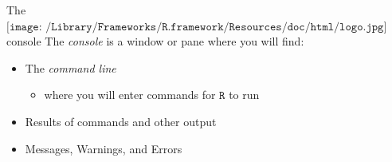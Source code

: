 \documentclass[
  ignorenonframetext,
]{beamer}
\providecommand{\tightlist}{%
  \setlength{\itemsep}{0pt}\setlength{\parskip}{0pt}}
\begin{document}
\begin{frame}{The
\(\texttt{[image: /Library/Frameworks/R.framework/Resources/doc/html/logo.jpg]}\)
console}
\protect\hypertarget{the-includegraphicsheight1emlibraryframeworksr.frameworkresourcesdochtmllogo.jpg-console}{}
The \emph{console} is a window or pane where you will find:

\begin{itemize}
\item
  The \emph{command line}

  \begin{itemize}
  \tightlist
  \item
    where you will enter commands for \(\texttt{R}\) to run
  \end{itemize}
\item
  Results of commands and other output
\item
  Messages, Warnings, and Errors
\end{itemize}
\end{frame}
\end{document}
